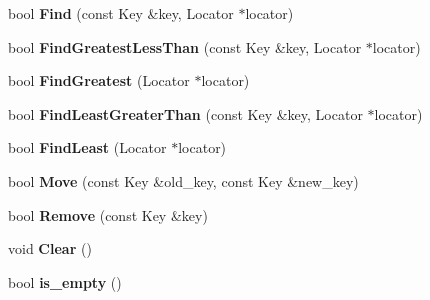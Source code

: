 \begin{DoxyCompactItemize}
\item 
bool {\bfseries Find} (const Key \&key, Locator $\ast$locator)\hypertarget{classv8_1_1internal_1_1_splay_tree_ad055e7fd298d8c50d7772584469bda67}{}\label{classv8_1_1internal_1_1_splay_tree_ad055e7fd298d8c50d7772584469bda67}

\item 
bool {\bfseries Find\+Greatest\+Less\+Than} (const Key \&key, Locator $\ast$locator)\hypertarget{classv8_1_1internal_1_1_splay_tree_a1017cfc30654ba532f6039eff73de8c8}{}\label{classv8_1_1internal_1_1_splay_tree_a1017cfc30654ba532f6039eff73de8c8}

\item 
bool {\bfseries Find\+Greatest} (Locator $\ast$locator)\hypertarget{classv8_1_1internal_1_1_splay_tree_aa9c4bffb3e15a22809a9014f374530e1}{}\label{classv8_1_1internal_1_1_splay_tree_aa9c4bffb3e15a22809a9014f374530e1}

\item 
bool {\bfseries Find\+Least\+Greater\+Than} (const Key \&key, Locator $\ast$locator)\hypertarget{classv8_1_1internal_1_1_splay_tree_a95fb504c2fa06a211446d983e689e944}{}\label{classv8_1_1internal_1_1_splay_tree_a95fb504c2fa06a211446d983e689e944}

\item 
bool {\bfseries Find\+Least} (Locator $\ast$locator)\hypertarget{classv8_1_1internal_1_1_splay_tree_a1379eb90062c1a6b9e7173792d651e86}{}\label{classv8_1_1internal_1_1_splay_tree_a1379eb90062c1a6b9e7173792d651e86}

\item 
bool {\bfseries Move} (const Key \&old\+\_\+key, const Key \&new\+\_\+key)\hypertarget{classv8_1_1internal_1_1_splay_tree_a401e85c47e6fc90f75ac37220d2a4bc2}{}\label{classv8_1_1internal_1_1_splay_tree_a401e85c47e6fc90f75ac37220d2a4bc2}

\item 
bool {\bfseries Remove} (const Key \&key)\hypertarget{classv8_1_1internal_1_1_splay_tree_a193702074e0c336766c28e68a8355c34}{}\label{classv8_1_1internal_1_1_splay_tree_a193702074e0c336766c28e68a8355c34}

\item 
void {\bfseries Clear} ()\hypertarget{classv8_1_1internal_1_1_splay_tree_a1ff226e5ca35dc162b0c5f878a7e6d8f}{}\label{classv8_1_1internal_1_1_splay_tree_a1ff226e5ca35dc162b0c5f878a7e6d8f}

\item 
bool {\bfseries is\+\_\+empty} ()\hypertarget{classv8_1_1internal_1_1_splay_tree_ad2d753c67a570c9d879fbf958b89feaa}{}\label{classv8_1_1internal_1_1_splay_tree_ad2d753c67a570c9d879fbf958b89feaa}


\end{DoxyCompactItemize}
